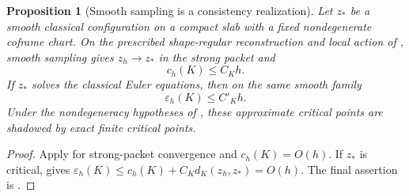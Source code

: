 \documentclass[11pt]{article}
\numberwithin{equation}{section}
\newtheorem{proposition}[proposition]{Proposition}
\theoremstyle{definition}
\theoremstyle{remark}
\begin{document}
\begin{proposition}[Smooth sampling is a consistency realization]
\label{prop:smooth-sampling}
Let $z_*$ be a smooth classical configuration on a compact slab with a fixed nondegenerate coframe chart. On the prescribed shape-regular reconstruction and local action of , smooth sampling gives $z_h\to z_*$ in the strong packet and
\begin{equation}
 c_h(K)\le C_Kh.
 \label{eq:sampling-consistency}
\end{equation}
If $z_*$ solves the classical Euler equations, then on the same smooth family
\begin{equation}
 \varepsilon_h(K)\le C'_Kh.
 \label{eq:sampling-stationarity}
\end{equation}
Under the nondegeneracy hypotheses of , these approximate critical points are shadowed by exact finite critical points.
\end{proposition}
\begin{proof}
Apply  for strong-packet convergence and
$c_h(K)=O(h)$. If $z_*$ is critical, 
gives $\varepsilon_h(K)\le c_h(K)+C_Kd_K(z_h,z_*)=O(h)$.
The final assertion is .
\end{proof}
\end{document}
